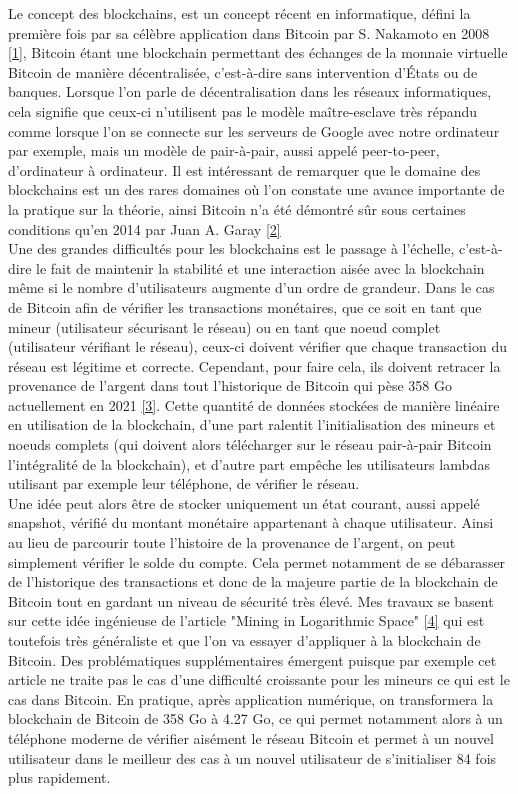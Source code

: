 \documentclass[12pt,a4paper]{article}
\newcommand{\source}[1]{\hyperlink{#1}{[#1]}}
\begin{document}
	Le concept des blockchains, est un concept récent en informatique, défini la première fois par sa célèbre application dans Bitcoin par S. Nakamoto en 2008 \source{1}, Bitcoin étant une blockchain permettant des échanges de la monnaie virtuelle Bitcoin de manière décentralisée, c'est-à-dire sans intervention d'États ou de banques. Lorsque l'on parle de décentralisation dans les réseaux informatiques, cela signifie que ceux-ci n'utilisent pas le modèle maître-esclave très répandu comme lorsque l'on se connecte sur les serveurs de Google avec notre ordinateur par exemple, mais un modèle de pair-à-pair, aussi appelé peer-to-peer, d'ordinateur à ordinateur. Il est intéressant de remarquer que le domaine des blockchains est un des rares domaines où l'on constate une avance importante de la pratique sur la théorie, ainsi Bitcoin n'a été démontré sûr sous certaines conditions qu'en 2014 par Juan A. Garay \source{2}\\
	Une des grandes difficultés pour les blockchains est le passage à l'échelle, c'est-à-dire le fait de maintenir la stabilité et une interaction aisée avec la blockchain même si le nombre d'utilisateurs augmente d'un ordre de grandeur. Dans le cas de Bitcoin afin de vérifier les transactions monétaires, que ce soit en tant que mineur (utilisateur sécurisant le réseau) ou en tant que noeud complet (utilisateur vérifiant le réseau), ceux-ci doivent vérifier que chaque transaction du réseau est légitime et correcte. Cependant, pour faire cela, ils doivent retracer la provenance de l'argent dans tout l'historique de Bitcoin qui pèse 358 Go actuellement en 2021 \source{3}. Cette quantité de données stockées de manière linéaire en utilisation de la blockchain, d'une part ralentit l'initialisation des mineurs et noeuds complets (qui doivent alors télécharger sur le réseau pair-à-pair Bitcoin l'intégralité de la blockchain), et d'autre part empêche les utilisateurs lambdas utilisant par exemple leur téléphone, de vérifier le réseau.\\ %
	Une idée peut alors être de stocker uniquement un état courant, aussi appelé snapshot, vérifié du montant monétaire appartenant à chaque utilisateur. Ainsi au lieu de parcourir toute l'histoire de la provenance de l'argent, on peut simplement vérifier le solde du compte. Cela permet notamment de se débarasser de l'historique des transactions et donc de la majeure partie de la blockchain de Bitcoin tout en gardant un niveau de sécurité très élevé. Mes travaux se basent sur cette idée ingénieuse de l'article "Mining in Logarithmic Space" \source{4} qui est toutefois très généraliste et que l'on va essayer d'appliquer à la blockchain de Bitcoin. Des problématiques supplémentaires émergent puisque par exemple cet article ne traite pas le cas d'une difficulté croissante pour les mineurs ce qui est le cas dans Bitcoin. En pratique, après application numérique, on transformera la blockchain de Bitcoin de 358 Go à 4.27 Go, ce qui permet notamment alors à un téléphone moderne de vérifier aisément le réseau Bitcoin et permet à un nouvel utilisateur dans le meilleur des cas à un nouvel utilisateur de s'initialiser 84 fois plus rapidement.\\
\end{document}
